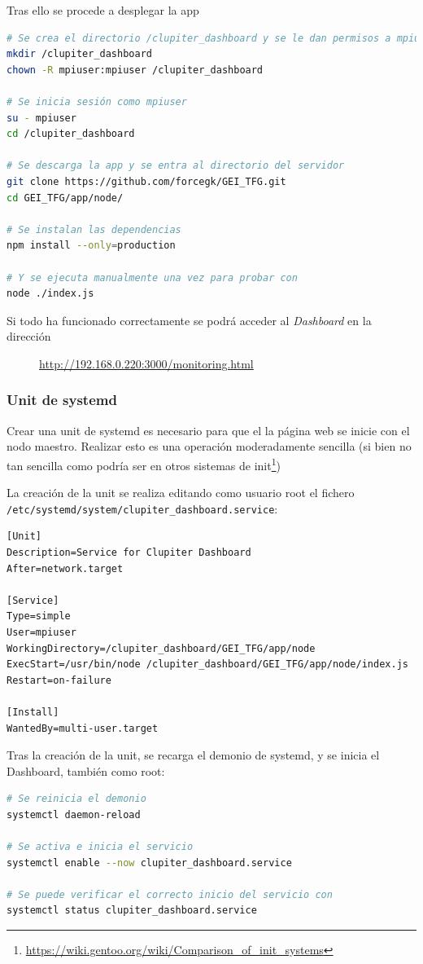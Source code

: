 Tras ello se procede a desplegar la app
\begin{lstlisting}[language=bash]
# Se crea el directorio /clupiter_dashboard y se le dan permisos a mpiuser
mkdir /clupiter_dashboard
chown -R mpiuser:mpiuser /clupiter_dashboard

# Se inicia sesión como mpiuser
su - mpiuser
cd /clupiter_dashboard

# Se descarga la app y se entra al directorio del servidor
git clone https://github.com/forcegk/GEI_TFG.git
cd GEI_TFG/app/node/

# Se instalan las dependencias
npm install --only=production

# Y se ejecuta manualmente una vez para probar con
node ./index.js
\end{lstlisting}

Si todo ha funcionado correctamente se podrá acceder al \textit{Dashboard} en la dirección

\begin{figure}[H]
    \vspace{0.3cm}
    \centering
    \url{http://192.168.0.220:3000/monitoring.html}
\end{figure}


\subsubsection{Unit de systemd}
Crear una unit de systemd es necesario para que el la página web se inicie con el nodo maestro. Realizar esto es una operación moderadamente sencilla (si bien no tan sencilla como podría ser en otros sistemas de init\footnote{\url{https://wiki.gentoo.org/wiki/Comparison_of_init_systems}}) 

La creación de la unit se realiza editando como usuario root el fichero \texttt{/etc/systemd/system/clupiter\_dashboard.service}:

\begin{lstlisting}[]
[Unit]
Description=Service for Clupiter Dashboard
After=network.target

[Service]
Type=simple
User=mpiuser
WorkingDirectory=/clupiter_dashboard/GEI_TFG/app/node
ExecStart=/usr/bin/node /clupiter_dashboard/GEI_TFG/app/node/index.js
Restart=on-failure

[Install]
WantedBy=multi-user.target
\end{lstlisting}

Tras la creación de la unit, se recarga el demonio de systemd, y se inicia el Dashboard, también como root:
\begin{lstlisting}[language=bash]
# Se reinicia el demonio
systemctl daemon-reload

# Se activa e inicia el servicio
systemctl enable --now clupiter_dashboard.service

# Se puede verificar el correcto inicio del servicio con
systemctl status clupiter_dashboard.service
\end{lstlisting}

